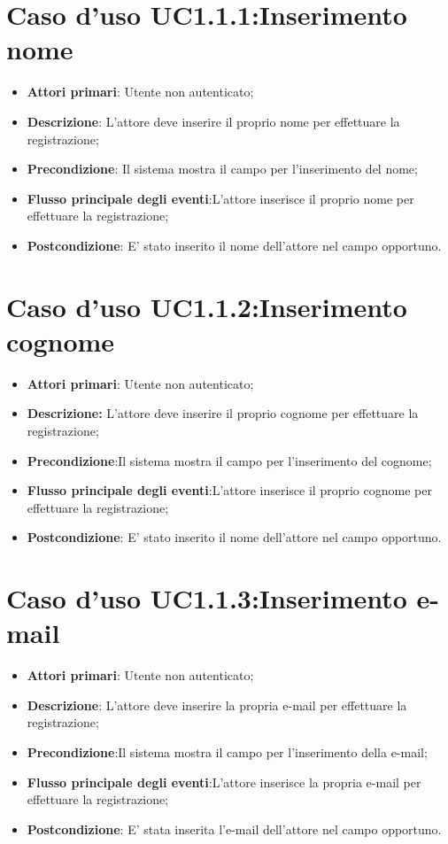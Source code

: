\section{Caso d'uso UC1.1.1:Inserimento nome}
\begin{itemize}
	\item \textbf{Attori primari}: Utente non autenticato;
	\item \textbf{Descrizione}: L'attore deve inserire il proprio nome per effettuare la registrazione;
	\item \textbf{Precondizione}: Il sistema mostra il campo per l'inserimento del nome;
	\item \textbf{Flusso principale degli eventi}:L'attore inserisce il proprio nome per effettuare la registrazione;
	\item \textbf{Postcondizione}: E' stato inserito il nome dell'attore nel campo opportuno.
\end{itemize}

\section{Caso d'uso UC1.1.2:Inserimento cognome}
\begin{itemize}
	\item \textbf{Attori primari}: Utente non autenticato;
	\item \textbf{Descrizione:} L'attore deve inserire il proprio cognome per effettuare la registrazione;
	\item \textbf{Precondizione}:Il sistema mostra il campo per l'inserimento del cognome;
	\item \textbf{Flusso principale degli eventi}:L'attore inserisce il proprio cognome per effettuare la registrazione;
	\item \textbf{Postcondizione}: E' stato inserito il nome dell'attore nel campo opportuno.
\end{itemize}

\section{Caso d'uso UC1.1.3:Inserimento e-mail}
	\begin{itemize}
		\item \textbf{Attori primari}: Utente non autenticato;
		\item \textbf{Descrizione}: L'attore deve inserire la propria e-mail per effettuare la  registrazione;
		\item \textbf{Precondizione}:Il sistema mostra il campo per l'inserimento della e-mail;
		\item \textbf{Flusso principale degli eventi}:L'attore inserisce la propria e-mail per effettuare la registrazione;
		\item \textbf{Postcondizione}: E' stata inserita l'e-mail dell'attore nel campo opportuno.
	\end{itemize}

